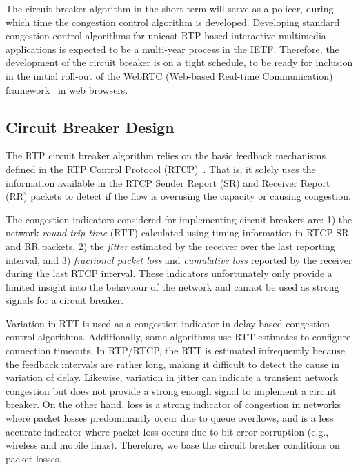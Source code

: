 The circuit breaker algorithm in the short term will serve as a policer,
during which time the congestion control algorithm is developed. Developing
standard congestion control algorithms for unicast RTP-based interactive
multimedia applications is expected to be a multi-year process in the IETF.
Therefore, the development of the circuit breaker is on a tight schedule, to
be ready for inclusion in the initial roll-out of the WebRTC (Web-based 
Real-time Communication) framework~\cite{jennings:2013:webrtc} in web browsers.

\subsection{Circuit Breaker Design}
\label{fw.cb.design}

The RTP circuit breaker algorithm relies on the basic feedback mechanisms
defined in the RTP Control Protocol (RTCP)~\cite{rfc3550}. That is, it solely
uses the information available in the RTCP Sender Report (SR) and Receiver
Report (RR) packets to detect if the flow is overusing the capacity or causing
congestion.

The congestion indicators considered for implementing circuit breakers are: 1)
the network \emph{round trip time} (RTT) calculated using timing information
in RTCP SR and RR packets, 2) the \emph{jitter} estimated by the receiver over the
last reporting interval, and 3) \emph{fractional packet loss} and \emph{cumulative
loss} reported by the receiver during the last RTCP interval. These
indicators unfortunately only provide a limited insight into the behaviour of
the network and cannot be used as strong signals for a circuit breaker.

Variation in RTT is used as a congestion indicator in delay-based congestion
control algorithms. Additionally, some algorithms use RTT estimates to
configure connection timeouts. In RTP/RTCP, the RTT is estimated infrequently
because the feedback intervals are rather long, making it difficult to detect
the cause in variation of delay. Likewise, variation in jitter can indicate a
transient network congestion but does not provide a strong enough signal to implement
a circuit breaker. On the other hand, loss is a strong indicator of congestion
in networks where packet losses predominantly occur due to queue overflows, and
is a less accurate indicator where packet loss occurs due to bit-error
corruption (e.g., wireless and mobile links). Therefore, we base the circuit
breaker conditions on packet losses. 


